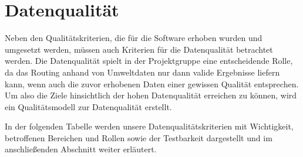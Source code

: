 \section{Datenqualität}
Neben den Qualitätskriterien, die für die Software erhoben wurden und umgesetzt werden, müssen auch Kriterien für die Datenqualität betrachtet werden. Die Datenqualität spielt in der Projektgruppe eine entscheidende Rolle, da das Routing anhand von Umweltdaten nur dann valide Ergebnisse liefern kann, wenn auch die zuvor erhobenen Daten einer gewissen Qualität entsprechen. Um also die Ziele hinsichtlich der hohen Datenqualität erreichen zu können, wird ein Qualitätsmodell zur Datenqualität erstellt.

In der folgenden Tabelle werden unsere Datenqualitätskriterien mit Wichtigkeit, betroffenen Bereichen und Rollen sowie der Testbarkeit dargestellt und im anschließenden Abschnitt weiter erläutert. \\

